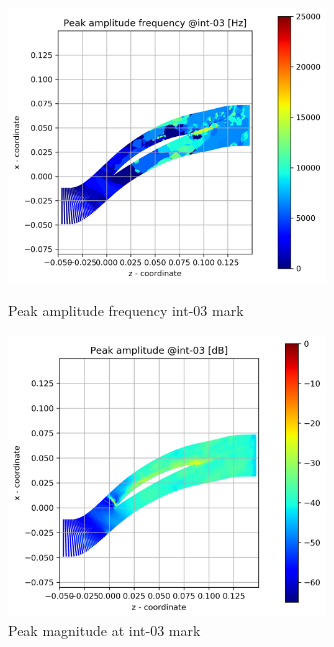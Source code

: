 \begin{figure}[ht]
  \centering
  \includegraphics[width=0.75\textwidth]{Figures/int-03-peak-freq.png}
  \caption{Peak amplitude frequency int-03 mark} \label{int-03-peak-freq}
  
  \vspace*{\floatsep}%

  \includegraphics[width=0.75\textwidth]{Figures/int-03-peak-mag.png}
  \caption{Peak magnitude at int-03 mark} \label{int-03-peak-mag}
\end{figure}

